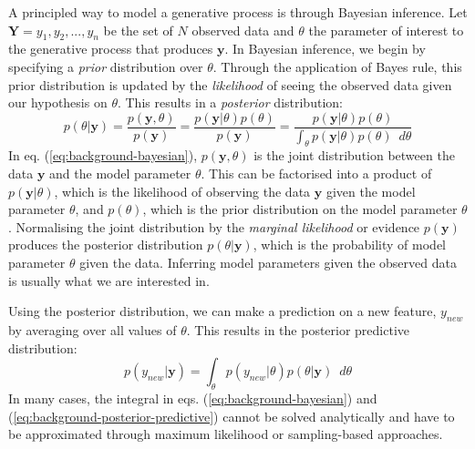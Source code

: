 A principled way to model a generative process is through Bayesian inference. Let $\mathbf{Y}=y_1,y_2,...,y_n$ be the set of $N$ observed data and $\theta$ the parameter of interest to the generative process that produces $\mathbf{y}$. In Bayesian inference, we begin by specifying a \emph{prior} distribution over $\theta$. Through the application of Bayes rule, this prior distribution is updated by the \emph{likelihood} of seeing the observed data given our hypothesis on $\theta$. This results in a \emph{posterior} distribution:
\begin{equation}
p(\theta \vert \mathbf{y})=\frac{p(\mathbf{y},\theta)}{p(\mathbf{y})}=\frac{p(\mathbf{y} \vert \theta)p(\theta)}{p(\mathbf{y})}=\frac{p(\mathbf{y} \vert \theta)p(\theta)}{\int_{\theta} p(\mathbf{y} \vert \theta)p(\theta) \enspace d\theta}
\label{eq:background-bayesian}
\end{equation}
In eq. (\ref{eq:background-bayesian}), $p(\mathbf{y},\theta)$ is the joint distribution between the data $\mathbf{y}$ and the model parameter $\theta$. This can be factorised into a product of $p(\mathbf{y} \vert \theta)$, which is the likelihood of observing the data $\mathbf{y}$ given the model parameter $\theta$, and $p(\theta)$, which is the prior distribution on the model parameter $\theta$. Normalising the joint distribution by the \emph{marginal likelihood} or evidence $p(\mathbf{y})$ produces the posterior distribution $p(\theta \vert \mathbf{y})$, which is the probability of model parameter $\theta$ given the data. Inferring model parameters given the observed data is usually what we are interested in.

Using the posterior distribution, we can make a prediction on a new feature, $y_{new}$ by averaging over all values of $\theta$. This results in the posterior predictive distribution:
\begin{equation}
p(y_{new} \vert \mathbf{y})=\int_{\theta} p(y_{new} \vert \theta) p(\theta \vert \mathbf{y}) \enspace d\theta
\label{eq:background-posterior-predictive}
\end{equation}
In many cases, the integral in eqs. (\ref{eq:background-bayesian}) and (\ref{eq:background-posterior-predictive}) cannot be solved analytically and have to be approximated through maximum likelihood or sampling-based approaches.

